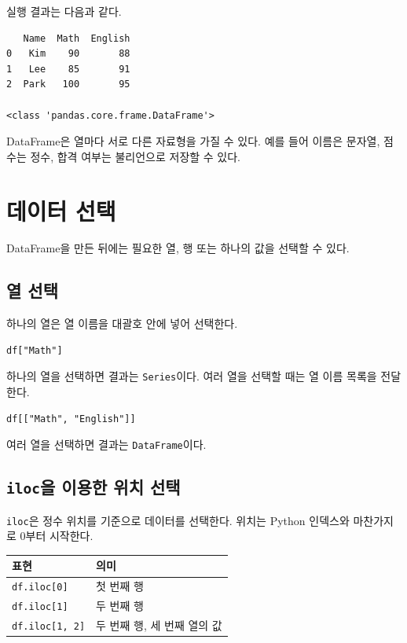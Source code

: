 \documentclass[11pt,a4paper]{article}
\begin{document}
실행 결과는 다음과 같다.

\begin{verbatim}
   Name  Math  English
0   Kim    90       88
1   Lee    85       91
2  Park   100       95

<class 'pandas.core.frame.DataFrame'>
\end{verbatim}

\begin{importantbox}
DataFrame은 열마다 서로 다른 자료형을 가질 수 있다. 예를 들어 이름은 문자열, 점수는 정수, 합격 여부는 불리언으로 저장할 수 있다.
\end{importantbox}

\section{데이터 선택}

DataFrame을 만든 뒤에는 필요한 열, 행 또는 하나의 값을 선택할 수 있다.

\subsection{열 선택}

하나의 열은 열 이름을 대괄호 안에 넣어 선택한다.

\begin{lstlisting}
df["Math"]
\end{lstlisting}

하나의 열을 선택하면 결과는 \texttt{Series}이다. 여러 열을 선택할 때는 열 이름 목록을 전달한다.

\begin{lstlisting}
df[["Math", "English"]]
\end{lstlisting}

여러 열을 선택하면 결과는 \texttt{DataFrame}이다.

\subsection{\texttt{iloc}을 이용한 위치 선택}

\texttt{iloc}은 정수 위치를 기준으로 데이터를 선택한다. 위치는 Python 인덱스와 마찬가지로 0부터 시작한다.

\begin{center}
\begin{tabular}{ll}
\toprule
표현 & 의미 \\
\midrule
\texttt{df.iloc[0]} & 첫 번째 행 \\
\texttt{df.iloc[1]} & 두 번째 행 \\
\texttt{df.iloc[1, 2]} & 두 번째 행, 세 번째 열의 값 \\
\bottomrule
\end{tabular}
\end{center}
\end{document}
